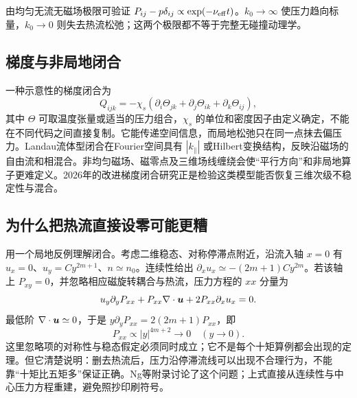 \documentclass[UTF8,a4paper,11pt,openany,fontset=fandol]{ctexbook}
\begin{document}
由均匀无流无磁场极限可验证 $P_{ij}-p\delta_{ij}\propto\exp(-\nu_{\rm eff}t)$。$k_0\to\infty$ 使压力趋向标量，$k_0\to0$ 则失去热流松弛；这两个极限都不等于完整无碰撞动理学。

\subsection{梯度与非局地闭合}
一种示意性的梯度闭合为
\begin{equation}Q_{ijk}=-\chi_s\left(\partial_i\Theta_{jk}+\partial_j\Theta_{ik}+\partial_k\Theta_{ij}\right),
\end{equation}
其中 $\Theta$ 可取温度张量或适当的压力组合，$\chi_s$ 的单位和密度因子由定义确定，不能在不同代码之间直接复制。它能传递空间信息，而局地松弛只在同一点抹去偏压力。Landau流体型闭合在Fourier空间具有 $|k_\parallel|$ 或Hilbert变换结构，反映沿磁场的自由流和相混合。非均匀磁场、磁零点及三维场线缠绕会使“平行方向”和非局地算子更难定义。2026年的改进梯度闭合研究正是检验这类模型能否恢复三维次级不稳定性与混合。\citep{Closure2026}

\subsection{为什么把热流直接设零可能更糟}
用一个局地反例理解闭合。考虑二维稳态、对称停滞点附近，沿流入轴 $x=0$ 有 $u_x=0$、$u_y=C y^{2m+1}$、$n\simeq n_0$。连续性给出
$\partial_xu_x\simeq-(2m+1)Cy^{2m}$。若该轴上 $P_{xy}=0$，并忽略相应磁旋转耦合与热流，压力方程的 $xx$ 分量为
\begin{equation}
u_y\partial_yP_{xx}+P_{xx}\nabla\cdot\bm{u}+2P_{xx}\partial_xu_x=0.
\end{equation}
最低阶 $\nabla\cdot\bm{u}\simeq0$，于是
$y\partial_yP_{xx}=2(2m+1)P_{xx}$，即
\begin{equation}P_{xx}\propto |y|^{4m+2}\longrightarrow0\quad(y\to0).
\end{equation}
这里忽略项的对称性与稳态假定必须同时成立；它不是每个十矩算例都会出现的定理。但它清楚说明：删去热流后，压力沿停滞流线可以出现不合理行为，不能靠“十矩比五矩多”保证正确。Ng等附录讨论了这个问题；上式直接从连续性与中心压力方程重建，避免照抄印刷符号。\citep{Ng2020}
\end{document}
